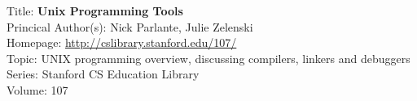 
Title: 	\textbf{Unix Programming Tools}	\\
Princical Author(s): 	Nick Parlante, Julie Zelenski \\
Homepage: 	\url{http://cslibrary.stanford.edu/107/}	\\	
Topic:		UNIX programming overview, discussing compilers, linkers and debuggers \\
Series:		Stanford CS Education Library	\\
Volume:		107 

